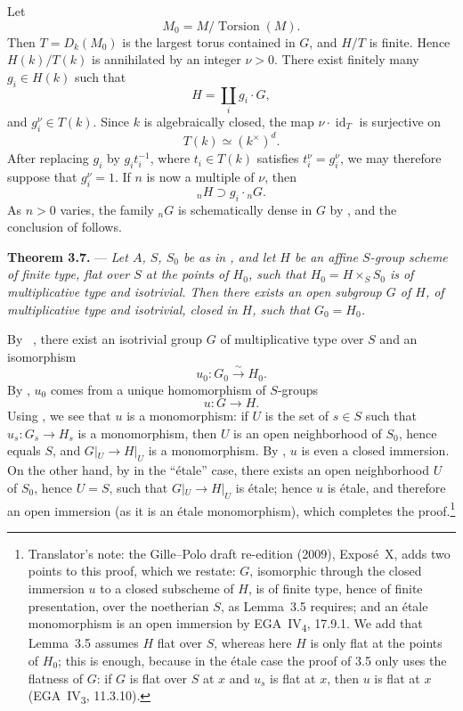 Let
\[
  M_0=M/\operatorname{Torsion}(M).
\]
Then \(T=D_k(M_0)\) is the largest torus contained in \(G\), and
\(H/T\) is finite. Hence \(H(k)/T(k)\) is annihilated by an integer
\(\nu>0\). There exist finitely many \(g_i\in H(k)\) such that
\[
  H=\coprod_i g_i\cdot G,
\]
and \(g_i^\nu\in T(k)\). Since \(k\) is algebraically closed, the map
\(\nu\cdot\operatorname{id}_T\) is surjective on
\[
  T(k)\simeq(k^\times)^d.
\]
After replacing \(g_i\) by \(g_it_i^{-1}\), where \(t_i\in T(k)\)
satisfies \(t_i^\nu=g_i^\nu\), we may therefore suppose that
\(g_i^\nu=1\). If \(n\) is now a multiple of \(\nu\), then
\[
  {}_nH\supset g_i\cdot{}_nG.
\]
As \(n>0\) varies, the family \({}_nG\) is schematically dense in
\(G\) by , and the conclusion of  follows.

\medskip
\noindent{}%
\textbf{Theorem 3.7.} ---
\textit{Let \(A\), \(S\), \(S_0\) be as in , and let \(H\) be an affine
\(S\)-group scheme of finite type, flat over \(S\) at the points of
\(H_0\), such that \(H_0=H\times_S S_0\) is of multiplicative type
and isotrivial. Then there exists an open subgroup \(G\) of \(H\), of
multiplicative type and isotrivial, closed in \(H\), such that
\(G_0=H_0\).}

By ~, there exist an isotrivial group \(G\) of multiplicative
type over \(S\) and an isomorphism
\[
  u_0:G_0\xrightarrow{\sim}H_0.
\]
By , \(u_0\) comes from a unique homomorphism of \(S\)-groups
\[
  u:G\longrightarrow H.
\]
Using , we see that \(u\) is a monomorphism: if \(U\) is the set
of \(s\in S\) such that \(u_s:G_s\to H_s\) is a monomorphism, then
\(U\) is an open neighborhood of \(S_0\), hence equals \(S\), and
\(G|_U\to H|_U\) is a monomorphism. By , \(u\) is even a closed
immersion. On the other hand, by  in the ``étale'' case,
there exists an open neighborhood \(U\) of \(S_0\), hence \(U=S\), such
that \(G|_U\to H|_U\) is étale; hence \(u\) is étale, and therefore an
open immersion (as it is an étale monomorphism), which completes the
proof.\footnote{Translator's note: the Gille--Polo draft re-edition
(2009), Expos\'e~X, adds two points to this proof, which we restate:
\(G\), isomorphic through the closed immersion \(u\) to a closed
subscheme of \(H\), is of finite type, hence of finite presentation,
over the noetherian \(S\), as Lemma~3.5 requires; and an \'etale
monomorphism is an open immersion by EGA~IV\textsubscript{4}, 17.9.1.
We add that Lemma~3.5 assumes \(H\) flat over \(S\), whereas here \(H\)
is only flat at the points of \(H_0\); this is enough, because in the
\'etale case the proof of 3.5 only uses the flatness of \(G\): if \(G\)
is flat over \(S\) at \(x\) and \(u_s\) is flat at \(x\), then \(u\) is
flat at \(x\) (EGA~IV\textsubscript{3}, 11.3.10).}

